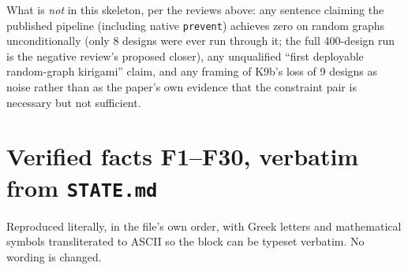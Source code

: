 \documentclass[10pt,a4paper]{article}
\newcommand{\fn}[1]{\nolinkurl{#1}}
\begin{document}
What is \emph{not} in this skeleton, per the reviews above: any sentence claiming the published
pipeline (including native \fn{prevent}) achieves zero on random graphs unconditionally (only 8
designs were ever run through it; the full 400-design run is the negative review's proposed
closer), any unqualified ``first deployable random-graph kirigami'' claim, and any framing of K9b's
loss of 9 designs as noise rather than as the paper's own evidence that the constraint pair is
necessary but not sufficient.


\appendix
\section{Verified facts F1--F30, verbatim from \texttt{STATE.md}}
Reproduced literally, in the file's own order, with Greek letters and mathematical symbols
transliterated to ASCII so the block can be typeset verbatim. No wording is changed.
\end{document}
